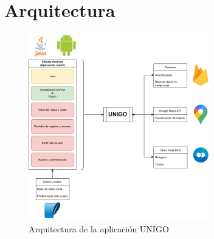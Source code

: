 \documentclass[a4paper,12pt]{report}
\begin{document}
    \section{Arquitectura}
      \begin{figure}[H]
        \centering
        \includegraphics[width=0.7\textwidth]{../.img/arquitectura.png}
        \caption{Arquitectura de la aplicación UNIGO}
        \label{fig:arquitectura}
      \end{figure}
\end{document}
